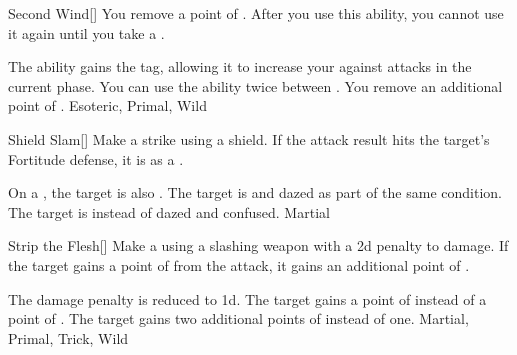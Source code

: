 \lowercase{\hypertarget{maneuver:Second Wind}{}}\label{maneuver:Second Wind}
\hypertarget{maneuver:Second Wind}{}
\begin{freeability}{Second Wind}[]
You remove a point of .
After you use this ability, you cannot use it again until you take a .

\rankline
{} The ability gains the  tag, allowing it to increase your  against attacks in the current phase.
 You can use the ability twice between .
 You remove an additional point of .
 Esoteric, Primal, Wild
\end{freeability}
\vspace{0.25em}



\lowercase{\hypertarget{maneuver:Shield Slam}{}}\label{maneuver:Shield Slam}
\hypertarget{maneuver:Shield Slam}{}
\begin{freeability}{Shield Slam}[]
Make a strike using a shield.
If the attack result hits the target's Fortitude defense,
it is  as a .

\rankline
{} On a , the target is also .
 The target is  and dazed as part of the same condition.
 The target is  instead of dazed and confused.
 Martial
\end{freeability}
\vspace{0.25em}



\lowercase{\hypertarget{maneuver:Strip the Flesh}{}}\label{maneuver:Strip the Flesh}
\hypertarget{maneuver:Strip the Flesh}{}
\begin{freeability}{Strip the Flesh}[]
Make a  using a slashing weapon with a \minus2d penalty to damage.
If the target gains a point of  from the attack, it gains an additional point of .

\rankline
{} The damage penalty is reduced to \minus1d.
 The target gains a point of  instead of a point of .
 The target gains two additional points of  instead of one.
 Martial, Primal, Trick, Wild
\end{freeability}
\vspace{0.25em}



